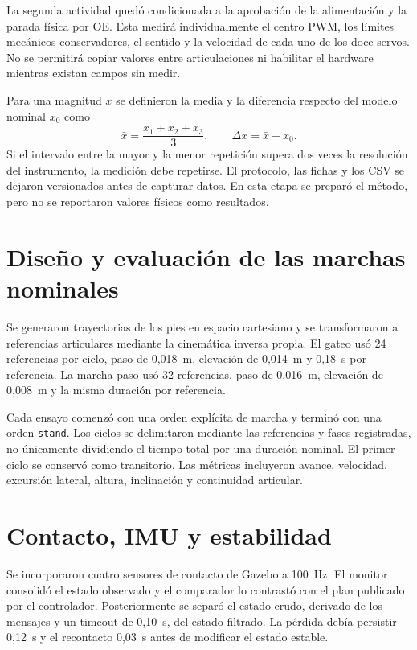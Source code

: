 La segunda actividad quedó condicionada a la aprobación de la alimentación y
la parada física por OE. Esta medirá individualmente el centro PWM, los límites
mecánicos conservadores, el sentido y la velocidad de cada uno de los doce
servos. No se permitirá copiar valores entre articulaciones ni habilitar el
hardware mientras existan campos sin medir.

Para una magnitud $x$ se definieron la media y la diferencia respecto del
modelo nominal $x_0$ como
\begin{equation}
  \bar{x}=\frac{x_1+x_2+x_3}{3}, \qquad \Delta x=\bar{x}-x_0.
\end{equation}
Si el intervalo entre la mayor y la menor repetición supera dos veces la
resolución del instrumento, la medición debe repetirse. El protocolo, las
fichas y los CSV se dejaron versionados antes de capturar datos. En esta etapa
se preparó el método, pero no se reportaron valores físicos como resultados.

\section{Diseño y evaluación de las marchas nominales}

Se generaron trayectorias de los pies en espacio cartesiano y se transformaron
a referencias articulares mediante la cinemática inversa propia. El gateo usó
24 referencias por ciclo, paso de 0,018~m, elevación de 0,014~m y 0,18~s por
referencia. La marcha paso usó 32 referencias, paso de 0,016~m, elevación de
0,008~m y la misma duración por referencia.

Cada ensayo comenzó con una orden explícita de marcha y terminó con una orden
\texttt{stand}. Los ciclos se delimitaron mediante las referencias y fases
registradas, no únicamente dividiendo el tiempo total por una duración nominal.
El primer ciclo se conservó como transitorio. Las métricas incluyeron avance,
velocidad, excursión lateral, altura, inclinación y continuidad articular.

\section{Contacto, IMU y estabilidad}

Se incorporaron cuatro sensores de contacto de Gazebo a 100~Hz. El monitor
consolidó el estado observado y el comparador lo contrastó con el plan publicado
por el controlador. Posteriormente se separó el estado crudo, derivado de los
mensajes y un timeout de 0,10~s, del estado filtrado. La pérdida debía persistir
0,12~s y el recontacto 0,03~s antes de modificar el estado estable.

